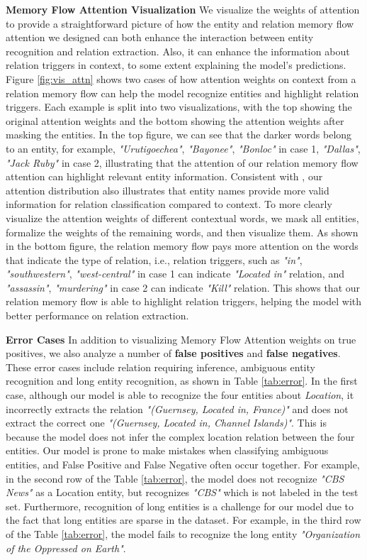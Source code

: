 \documentclass[sigconf]{acmart}
\begin{document}
\noindent \textbf{Memory Flow Attention Visualization}
We visualize the weights of attention to provide a straightforward picture of how the entity and relation memory flow attention we designed can both enhance the interaction between entity recognition and relation extraction. Also, it can enhance the information about relation triggers in context, to some extent explaining the model's predictions.
Figure \ref{fig:vis_attn} shows two cases of how attention weights on context from a relation memory flow can help the model recognize entities and highlight relation triggers. Each example is split into two visualizations, with the top showing the original attention weights and the bottom showing the attention weights after masking the entities. In the top figure, we can see that the darker words belong to an entity, for example, \textit{"Urutigoechea"}, \textit{"Bayonee"}, \textit{"Bonloc"} in case 1, \textit{"Dallas"}, \textit{"Jack Ruby"} in case 2,  illustrating that the attention of our relation memory flow attention can highlight relevant entity information. Consistent with \cite{han2020more}, our attention distribution also illustrates that entity names provide more valid information for relation classification compared to context. To more clearly visualize the attention weights of different contextual words, we mask all entities, formalize the weights of the remaining words, and then visualize them. As shown in the bottom figure, the relation memory flow pays more attention on the words that indicate the type of relation, i.e., relation triggers, such as \textit{"in"}, \textit{"southwestern"}, \textit{"west-central"} in case 1 can indicate \textit{"Located in"} relation, and \textit{"assassin"}, \textit{"murdering"} in case 2 can indicate \textit{"Kill"} relation. This shows that our relation memory flow is able to highlight relation triggers, helping the model with better performance on relation extraction. 


\noindent\textbf{Error Cases} 
In addition to visualizing Memory Flow Attention weights on true positives, we also analyze a number of \textbf{false positives} and \textbf{false negatives}. These error cases include relation requiring inference, ambiguous entity recognition and long entity recognition, as shown in Table \ref{tab:error}. In the first case, although our model is able to recognize the four entities about \textit{Location}, it incorrectly extracts the relation \textit{"(Guernsey, Located in, France)"} and does not extract the correct one \textit{"(Guernsey, Located in, Channel Islands)"}. This is because the model does not infer the complex location relation between the four entities. Our model is prone to make mistakes when classifying ambiguous entities, and False Positive and False Negative often occur together. For example, in the second row of the Table \ref{tab:error}, the model does not recognize \textit{"CBS News"} as a Location entity, but recognizes \textit{"CBS"} which is not labeled in the test set.
Furthermore, recognition of long entities is a challenge for our model due to the fact that long entities are sparse in the dataset. For example, in the third row of the Table \ref{tab:error}, the model fails to recognize the long entity \textit{"Organization of the Oppressed on Earth"}.
\end{document}
